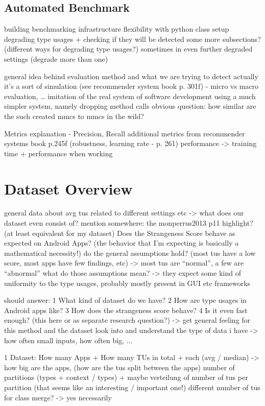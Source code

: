 \subsection{Automated Benchmark}

building benchmarking infrastructure
flexibility with python class setup
degrading type usages + checking if they will be detected
    some more subsections? (different ways for degrading type usages?)
    sometimes in even further degraded settings (degrade more than one)

general idea behind evaluation method and what we are trying to detect
actually it's a sort of simulation (see recommender system book p. 301f) - micro vs macro evaluation, \ldots
    imitation of the real system of software development
    using a much simpler system, namely dropping method calls
    obvious question: how similar are the such created mmcs to mmcs in the wild?

Metrics explanation - Precision, Recall
    additional metrics from recommender systems book p.245f (robustness, learning rate - p. 261)
    performance -> training time + performance when working

\section{Dataset Overview}

general data about avg tus related to different settings etc -> what does our dataset even consist of?
mention somewhere: the monperrus2013 p11 highlight? (at least equivalent for my dataset)
Does the Strangeness Score behave as expected on Android Apps? (the behavior that I'm expecting is basically a mathematical necessity!)
    do the general assumptions hold? (most tus have a low score, most apps have few findings, etc)
        -> most tus are ``normal'', a few are ``abnormal''
        what do those assumptions mean? -> they expect some kind of uniformity to the type usages, probably mostly present in GUI etc frameworks

should answer:
    1 What kind of dataset do we have?
    2 How are type usages in Android apps like?
    3 How does the strangeness score behave?
    4 Is it even fast enough? (this here or as separate research question?)
-> get general feeling for this method and the dataset
look into and understand the type of data i have -> how often small inputs, how often big, ...

1 Dataset:
    How many Apps + How many TUs in total + each (avg / median) -> how big are the apps, (how are the tus split between the apps)
    number of partitions (types + context / types) + maybe verteilung of number of tus per partition (that seems like an interesting / important one!)
    different number of tus for class merge? -> yes necessarily

